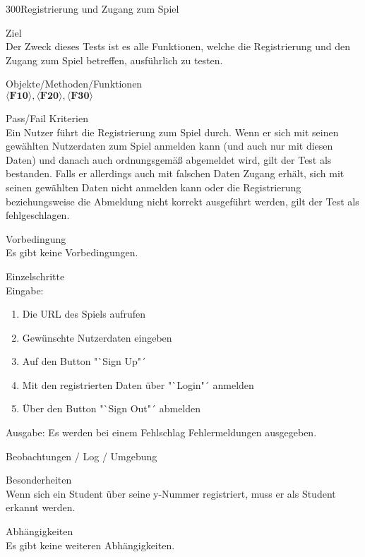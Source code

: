 \begin{testcase}{300}{Registrierung und Zugang zum Spiel}

\item[Ziel]~\\
Der Zweck dieses Tests ist es alle Funktionen, welche die Registrierung und den Zugang zum Spiel betreffen, ausführlich zu testen.

\item[Objekte/Methoden/Funktionen]~\\
$\langle\textbf{F10}\rangle, \langle\textbf{F20}\rangle, \langle\textbf{F30}\rangle$ 

\item[Pass/Fail Kriterien]~\\
Ein Nutzer führt die Registrierung zum Spiel durch. Wenn er sich mit seinen gewählten Nutzerdaten zum Spiel anmelden kann (und auch nur mit diesen Daten) und danach auch ordnungsgemäß abgemeldet wird, gilt der Test als bestanden. Falls er allerdings auch mit falschen Daten Zugang erhält, sich mit seinen gewählten Daten nicht anmelden kann oder die Registrierung beziehungsweise die Abmeldung nicht korrekt ausgeführt werden, gilt der Test als fehlgeschlagen.

\item[Vorbedingung]~\\
Es gibt keine Vorbedingungen.

\item[Einzelschritte]~\\

Eingabe:
\begin{enumerate}
\item Die URL des Spiels aufrufen
\item Gewünschte Nutzerdaten eingeben
\item Auf den Button "`Sign Up"´
\item Mit den registrierten Daten über "`Login"´ anmelden 
\item Über den Button "`Sign Out"´ abmelden
\end{enumerate}
Ausgabe:
Es werden bei einem Fehlschlag Fehlermeldungen ausgegeben.

\item[Beobachtungen / Log / Umgebung]~\\

\item[Besonderheiten]~\\
Wenn sich ein Student über seine y-Nummer registriert, muss er als Student erkannt werden.

\item[Abhängigkeiten]~\\
Es gibt keine weiteren Abhängigkeiten.

\end{testcase}

